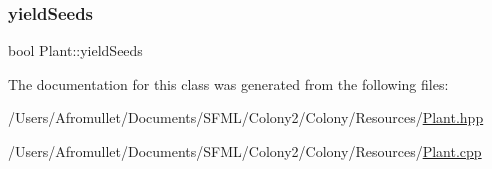 \subsubsection{\texorpdfstring{yield\+Seeds}{yieldSeeds}}
{\footnotesize\ttfamily bool Plant\+::yield\+Seeds\hspace{0.3cm}{\ttfamily [private]}}



The documentation for this class was generated from the following files\+:\begin{DoxyCompactItemize}
\item 
/\+Users/\+Afromullet/\+Documents/\+S\+F\+M\+L/\+Colony2/\+Colony/\+Resources/\mbox{\hyperlink{_plant_8hpp}{Plant.\+hpp}}\item 
/\+Users/\+Afromullet/\+Documents/\+S\+F\+M\+L/\+Colony2/\+Colony/\+Resources/\mbox{\hyperlink{_plant_8cpp}{Plant.\+cpp}}\end{DoxyCompactItemize}
